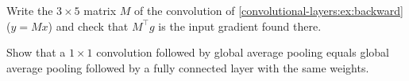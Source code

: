 \begin{notechapter}
\begin{exercise}\label{convolutional-layers:exr:4}
Write the $3\times5$ matrix $M$ of the convolution of \cref{convolutional-layers:ex:backward} ($y = Mx$) and check that
$M^\top g$ is the input gradient found there.
\end{exercise}

\begin{exercise}\label{convolutional-layers:exr:5}
Show that a $1\times1$ convolution followed by global average pooling equals global average
pooling followed by a fully connected layer with the same weights.
\end{exercise}
\end{notechapter}
